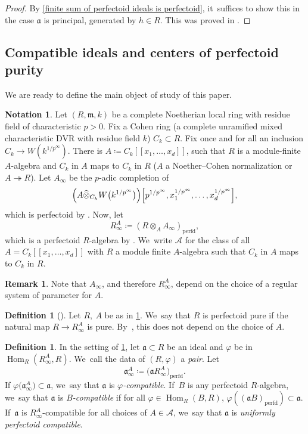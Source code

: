 \documentclass[JEP,XML,SOM,Unicode,published]{cedram}
\let\autoref\cref
\theoremstyle{plain}
\theoremstyle{definition}
\newtheorem{definition}[theorem]{Definition}
\newtheorem{remark}[theorem]{Remark}
\newtheorem{notation}[theorem]{Notation}
\numberwithin{equation}{theorem}
\let\infinity\infty
\let\tensor\otimes
\newcommand{\fra}{\mathfrak{a}}
\newcommand{\m}{\mathfrak{m}}
\DeclareMathOperator{\Hom}{Hom}
\newcommand{\perfd}{_{\mathrm{perfd}}}
\newcommand{\llbracket}{[\![}
\newcommand{\rrbracket}{]\!]}
\newcommand{\sA}{\mathcal{A}}
\renewcommand{\phi}{\varphi}
\newcommand{\unpfty}{{1/p^\infty}}
\newcommand{\rainfty}{R^A_\infty}
\newcommand{\rafty}{R^A_\infty}
\begin{document}
\begin{proof}
By \autoref{finite sum of perfectoid ideals is perfectoid}, it~suffices to show this in the case $\fra$ is principal, generated by $h\in R$. This was proved in \cite[Lem.\,2.4.3]{CaiLeeMaSchwedeTuckerPerfectoidSignature}.
\end{proof}

\subsection{Compatible ideals and centers of perfectoid purity} We are ready to define the main object of study of this paper.

\begin{notation}\label{notation rainfty}
Let $(R,\m, k)$ be a complete Noetherian local ring with residue field of characteristic $p>0$. Fix a Cohen ring (a complete unramified mixed characteristic DVR with residue field $k$) $C_k\subset R$. Fix once and for all an inclusion $C_k\to W(k^\unpfty)$.
There is $A\coloneqq C_k\llbracket x_1,\ldots,x_d\rrbracket$, such that $R$ is a module-finite $A$-algebra and $C_k$ in $A$ maps to $C_k$ in $R$ (\eg $A$ a Noether--Cohen normalization or $A\twoheadrightarrow R$). Let $A_\infty$ be the $p$-adic completion of
\[
\Bigl(A\widehat{\tensor}_{C_k} W\bigl(k^\unpfty\bigr)\Bigr)\Bigl[p^\unpfty,x_1^\unpfty,\ldots,x_d^\unpfty\Bigr],
\]
which is perfectoid by \cite[Ex.\,3.8\,(4)]{BhattIyengarMaRegularRings}. Now, let
\[
\rainfty\coloneqq (R\tensor_A A_\infty)\perfd,
\]
which is a perfectoid $R$\nobreakdash-algebra by \cite[Th.\,10.11]{BhattScholzePrisms}. We~write $\sA$ for the class of all $A=C_k\llbracket x_1,\ldots,x_d\rrbracket$ with $R$ a module finite $A$-algebra such that $C_k$ in $A$ maps to $C_k$ in $R$.
\end{notation}
\begin{remark}
Note that $A_\infinity$, and therefore $\rafty$, depend on the choice of a regular system of parameter for $A$.
\end{remark}

\begin{definition}[{\cite{BMPSTWWPerfectoidPure}}]
Let $R,\ A$ be as in \autoref{notation rainfty}. We~say that $R$ is perfectoid pure if the natural map $R\to \rafty$ is pure. By~\cite[Lem.\,4.23]{BMPSTWWPerfectoidPure}, this does not depend on the choice of $A$.
\end{definition}

\begin{definition}
In the setting of \autoref{notation rainfty}, let $\fra\subset R$ be an ideal and $\phi$ be in $\Hom_R(\rafty, R)$. We~call the data of $(R,\phi)$ a \emph{pair}.
Let
\[\fra^A_\infty\coloneqq\bigl(\fra\rafty\bigr)\perfd.
\]
If $\phi\bigl(\fra_\infty^A\bigr)\subset \fra$, we~say that
$\fra$ is \emph{$\phi$-compatible}. If~$B$ is any perfectoid $R$\nobreakdash-algebra, we~say that $\fra$ is \emph{$B$-compatible} if for all $\phi\in \Hom_R(B,R)$, $\phi((\fra B)\perfd)\subset \fra$. If~$\fra$ is $\rafty$\nobreakdash-compatible for all choices of $A\in \sA$, we~say that $\fra$ is \emph{uniformly perfectoid compatible}.
\end{definition}
\end{document}
